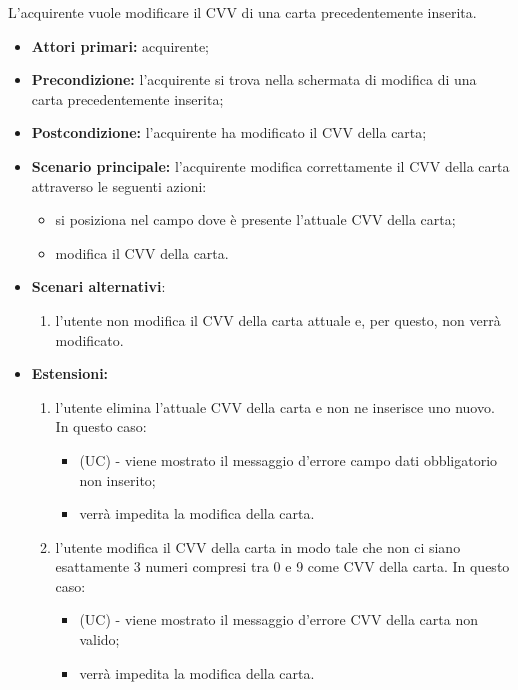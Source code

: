 L'acquirente vuole modificare il CVV di una carta precedentemente inserita.
\begin{itemize}
    \item \textbf{Attori primari:} acquirente;
    \item \textbf{Precondizione:} l'acquirente si trova nella schermata di modifica di una carta precedentemente inserita;
    \item \textbf{Postcondizione:} l'acquirente ha modificato il CVV della carta;
    \item \textbf{Scenario principale:} l'acquirente modifica correttamente il CVV della carta attraverso le seguenti azioni:
    \begin{itemize}
        \item si posiziona nel campo dove è presente l'attuale CVV della carta;
        \item modifica il CVV della carta.
    \end{itemize}
    \item \textbf{Scenari alternativi}:
    \begin{enumerate}[label=\lett]
        \item l'utente non modifica il CVV della carta attuale e, per questo, non verrà modificato.
    \end{enumerate}
    \item \textbf{Estensioni:}
    \begin{enumerate}[label=\lett]
        \item l'utente elimina l'attuale CVV della carta e non ne inserisce uno nuovo. In questo caso:
        \begin{itemize}
            \item (UC) - viene mostrato il messaggio d'errore campo dati obbligatorio non inserito;
            \item verrà impedita la modifica della carta.
        \end{itemize}
        \item l'utente modifica il CVV della carta in modo tale che non ci siano esattamente 3 numeri compresi tra 0 e 9 come CVV della carta. In questo caso:
        \begin{itemize}
            \item (UC) - viene mostrato il messaggio d'errore CVV della carta non valido;
            \item verrà impedita la modifica della carta.
        \end{itemize}
    \end{enumerate}
\end{itemize}

